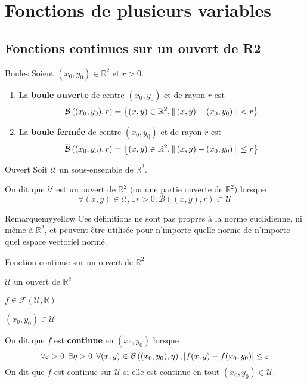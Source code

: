 \section{Fonctions de plusieurs variables}

\subsection{Fonctions continues sur un ouvert de R2}

    \begin{defi}{Boules}{}
        Soient $(x_0,y_0) \in \mathbb{R}^2$ et $r > 0$.
        \begin{enumerate}
            \item La \textbf{boule ouverte} de centre $(x_0,y_0)$ et de rayon $r$ est 
            \[ \mathcal{B}\left((x_0,y_0),r\right) = \left\{ (x,y) \in \mathbb{R}^2, \left\lVert\,(x,y) - (x_0,y_0)\,\right\rVert < r \right\} \]
            \item La \textbf{boule fermée} de centre $(x_0,y_0)$ et de rayon $r$ est 
            \[ \overline{\mathcal{B}}\left((x_0,y_0),r\right) = \left\{ (x,y) \in \mathbb{R}^2, \left\lVert\,(x,y) - (x_0,y_0)\,\right\rVert \leq r \right\} \]
        \end{enumerate}
    \end{defi}

    \begin{defi}{Ouvert}{}
        Soit $\mathcal{U}$ un sous-ensemble de $\mathbb{R}^2$.

        On dit que $\mathcal{U}$ est un ouvert de $\mathbb{R}^2$ (ou une partie ouverte de $\mathbb{R}^2$) lorsque 
        \[ \forall (x,y) \in \mathcal{U}, \exists r > 0, \mathcal{B}\left((x,y),r\right) \subset \mathcal{U} \]
    \end{defi}

    \begin{omed}{Remarque}{myyellow}
        Ces définitions ne sont pas propres à la norme euclidienne, ni même à $\mathbb{R}^2$, et peuvent être utilisée pour n’importe quelle norme de n’importe quel espace vectoriel normé.
    \end{omed}

    \begin{defi}{Fonction continue sur un ouvert de $\mathbb{R}^2$}{}
        \begin{soient}
            \item $\mathcal{U}$ un ouvert de $\mathbb{R}^2$
            \item $f \in \mathcal{F}(\mathcal{U},\mathbb{R})$
            \item $(x_0,y_0) \in \mathcal{U}$
        \end{soient}
        On dit que $f$ est \textbf{continue} en $(x_0,y_0)$ lorsque 
        \[ \forall \varepsilon > 0,  \exists \eta > 0,  \forall(x,y) \in \mathcal{B}\left((x_0,y_0),\eta\right),  \left\lvert f(x,y)-f(x_0,y_0)\right\rvert \leq \varepsilon \]
        On dit que $f$ est continue sur $\mathcal{U}$ si elle est continue en tout $(x_0,y_0) \in \mathcal{U}$.
    \end{defi}

